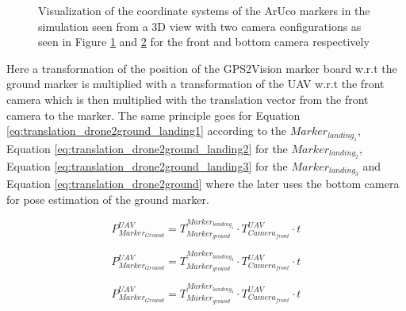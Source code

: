 \documentclass[../Head/report.tex]{subfiles}
\begin{document}
\begin{figure}[H]
    \centering
    \begin{subfigure}[t]{.48\textwidth}
        \centering
\scalebox{1.0}{}
		\caption{}
        \label{fig:3d_view_aruco_front_camera}
    \end{subfigure}
    \hfill
    \begin{subfigure}[t]{.48\textwidth}
        \centering
\scalebox{1.0}{}
        \caption{}
        \label{fig:3d_view_aruco_bottom_camera}
    \end{subfigure}
    \caption{Visualization of the coordinate systems of the ArUco markers in the simulation seen from a 3D view with two camera configurations as seen in Figure \ref{fig:3d_view_aruco_front_camera} and \ref{fig:3d_view_aruco_bottom_camera} for the front and bottom camera respectively}
    \label{fig:3d_view_aruco_coordinate_systems}
\end{figure}

Here a transformation of the position of the GPS2Vision marker board w.r.t the ground marker is multiplied with a transformation of the UAV w.r.t the front camera which is then multiplied with the translation vector from the front camera to the marker. The same principle goes for Equation \ref{eq:translation_drone2ground_landing1} according to the $Marker_{landing_1}$, Equation \ref{eq:translation_drone2ground_landing2} for the $Marker_{landing_2}$, Equation  \ref{eq:translation_drone2ground_landing3} for the  $Marker_{landing_3}$ and Equation \ref{eq:translation_drone2ground} where the later uses the bottom camera for pose estimation of the ground marker.   


\begin{equation}
	P^{UAV}_{Marker_{Ground}} = T^{Marker_{landing_1}}_{Marker_{ground}} \cdot T^{UAV}_{Camera_{front}} \cdot t
	\label{eq:translation_drone2ground_landing1}   
\end{equation}       

\begin{equation}
	P^{UAV}_{Marker_{Ground}} = T^{Marker_{landing_2}}_{Marker_{ground}} \cdot T^{UAV}_{Camera_{front}} \cdot t
	\label{eq:translation_drone2ground_landing2} 
\end{equation} 

\begin{equation}
	P^{UAV}_{Marker_{Ground}} = T^{Marker_{landing_3}}_{Marker_{ground}} \cdot T^{UAV}_{Camera_{front}} \cdot t
	\label{eq:translation_drone2ground_landing3}   
\end{equation} 
\end{document}
